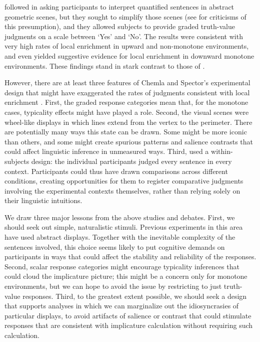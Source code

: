 \documentclass[leqno,12pt]{article}
\begin{document}
\citet{Chemla:Spector:2011} followed \citet{Geurts:Pouscoulous:2009}
in asking participants to interpret quantified sentences in abstract
geometric scenes, but they sought to simplify those scenes (see
 for criticisms of this
presumption), and they allowed subjects to provide graded truth-value
judgments on a scale between `Yes' and `No'. The results were
consistent with very high rates of local enrichment in upward and
non-monotone environments, and even yielded suggestive evidence for
local enrichment in downward monotone environments. These findings
stand in stark contrast to those of \citet{Geurts:Pouscoulous:2009}.

However, there are at least three features of Chemla and Spector's
experimental design that might have exaggerated the rates of judgments
consistent with local enrichment
\citep{geurts-vantiel:2013:scalar}. First, the graded response
categories mean that, for the monotone cases, typicality effects might
have played a role. Second, the visual scenes were wheel-like displays
in which lines extend from the vertex to the perimeter. There are
potentially many ways this state can be drawn.  Some might be more
iconic than others, and some might create spurious patterns and
salience contrasts that could affect linguistic inference in
unmeasured ways. Third, \citeauthor{Chemla:Spector:2011} used a
within-subjects design: the individual participants judged every
sentence in every context. Participants could thus have drawn
comparisons across different conditions, creating opportunities for
them to register comparative judgments involving the experimental
contexts themselves, rather than relying solely on their linguistic
intuitions.

We draw three major lessons from the above studies and debates. First,
we should seek out simple, naturalistic stimuli. Previous experiments
in this area have used abstract displays. Together with the inevitable
complexity of the sentences involved, this choice seems likely to put
cognitive demands on participants in ways that could affect the
stability and reliability of the responses. Second, scalar response
categories might encourage typicality inferences that could cloud the
implicature picture; this might be a concern only for monotone
environments, but we can hope to avoid the issue by restricting to
just truth-value responses. Third, to the greatest extent possible, we
should seek a design that supports analyses in which we can
marginalize out the idiosyncrasies of particular displays, to avoid
artifacts of salience or contrast that could stimulate responses that
are consistent with implicature calculation without requiring such
calculation.
\end{document}
